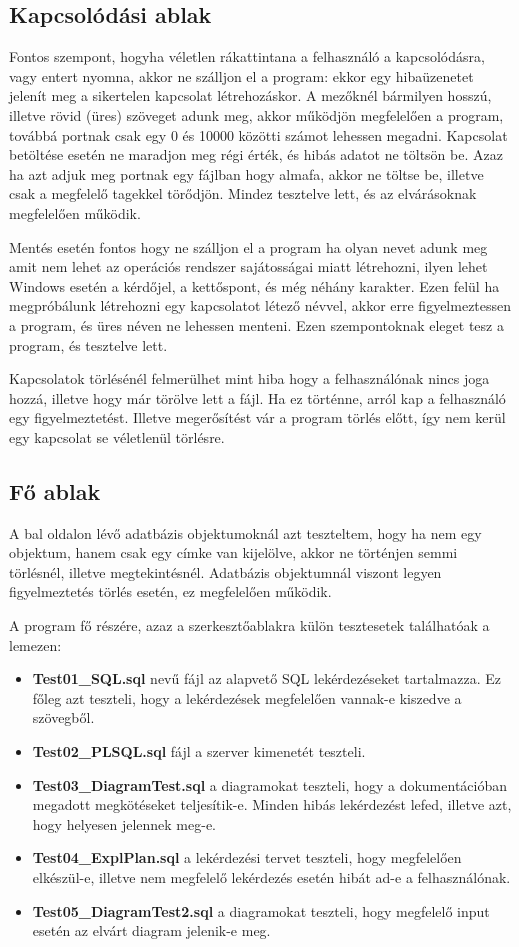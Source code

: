 \subsection{Kapcsolódási ablak}
Fontos szempont, hogyha véletlen rákattintana a felhasználó a kapcsolódásra, vagy entert nyomna, akkor ne szálljon el a program: ekkor egy hibaüzenetet jelenít meg a sikertelen kapcsolat létrehozáskor. A mezőknél bármilyen hosszú, illetve rövid (üres) szöveget adunk meg, akkor működjön megfelelően a program, továbbá portnak csak egy 0 és 10000 közötti számot lehessen megadni. Kapcsolat betöltése esetén ne maradjon meg régi érték, és hibás adatot ne töltsön be. Azaz ha azt adjuk meg portnak egy fájlban hogy almafa, akkor ne töltse be, illetve csak a megfelelő tagekkel törődjön. Mindez tesztelve lett, és az elvárásoknak megfelelően működik.

Mentés esetén fontos hogy ne szálljon el a program ha olyan nevet adunk meg amit nem lehet az operációs rendszer sajátosságai miatt létrehozni, ilyen lehet Windows esetén a kérdőjel, a kettőspont, és még néhány karakter. Ezen felül ha megpróbálunk létrehozni egy kapcsolatot létező névvel, akkor erre figyelmeztessen a program, és üres néven ne lehessen menteni. Ezen szempontoknak eleget tesz a program, és tesztelve lett.

Kapcsolatok törlésénél felmerülhet mint hiba hogy a felhasználónak nincs joga hozzá, illetve hogy már törölve lett a fájl. Ha ez történne, arról kap a felhasználó egy figyelmeztetést. Illetve megerősítést vár a program törlés előtt, így nem kerül egy kapcsolat se véletlenül törlésre.

\subsection{Fő ablak}

A bal oldalon lévő adatbázis objektumoknál azt teszteltem, hogy ha nem egy objektum, hanem csak egy címke van kijelölve, akkor ne történjen semmi törlésnél, illetve megtekintésnél. Adatbázis objektumnál viszont legyen figyelmeztetés törlés esetén, ez megfelelően működik.

A program fő részére, azaz a szerkesztőablakra külön tesztesetek találhatóak a lemezen:
\begin{itemize}
  \item \textbf{Test01\_SQL.sql} nevű fájl az alapvető SQL lekérdezéseket tartalmazza. Ez főleg azt teszteli, hogy a lekérdezések megfelelően vannak-e kiszedve a szövegből.
  \item \textbf{Test02\_PLSQL.sql} fájl a szerver kimenetét teszteli.
  \item \textbf{Test03\_DiagramTest.sql} a diagramokat teszteli, hogy a dokumentációban megadott megkötéseket teljesítik-e. Minden hibás lekérdezést lefed, illetve azt, hogy helyesen
  jelennek meg-e.
  \item \textbf{Test04\_ExplPlan.sql} a lekérdezési tervet teszteli, hogy megfelelően elkészül-e, illetve nem megfelelő lekérdezés esetén hibát ad-e a felhasználónak.
  \item \textbf{Test05\_DiagramTest2.sql} a diagramokat teszteli, hogy megfelelő input esetén az elvárt diagram jelenik-e meg.
\end{itemize}

